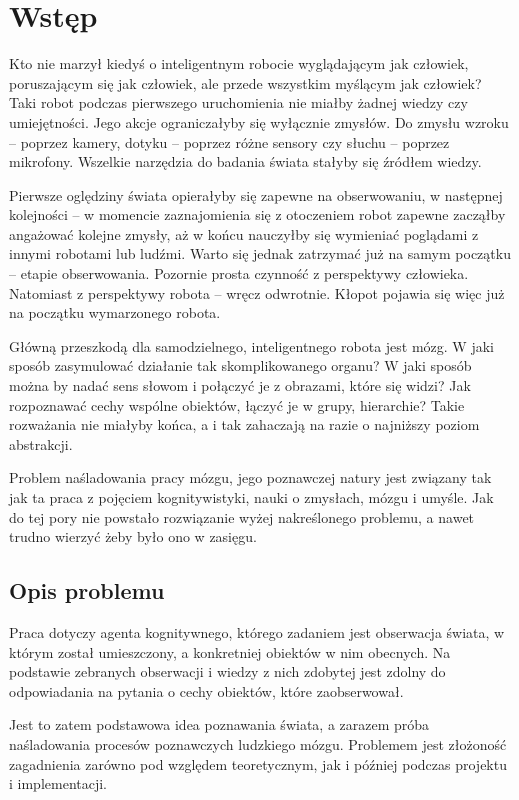 \chapter*{Wstęp}

Kto nie marzył kiedyś o inteligentnym robocie wyglądającym jak człowiek, poruszającym się jak człowiek, ale przede wszystkim myślącym jak człowiek? Taki robot podczas pierwszego uruchomienia nie miałby żadnej wiedzy czy umiejętności. Jego akcje ograniczałyby się wyłącznie zmysłów. Do zmysłu wzroku -- poprzez kamery, dotyku -- poprzez różne sensory czy słuchu -- poprzez mikrofony. Wszelkie narzędzia do badania świata stałyby się źródłem wiedzy.

Pierwsze oględziny świata opierałyby się zapewne na obserwowaniu, w następnej kolejności -- w momencie zaznajomienia się z otoczeniem robot zapewne zacząłby angażować kolejne zmysły, aż w końcu nauczyłby się wymieniać poglądami z innymi robotami lub ludźmi. Warto się jednak zatrzymać już na samym początku -- etapie obserwowania. Pozornie prosta czynność z perspektywy człowieka. Natomiast z perspektywy robota -- wręcz odwrotnie. Kłopot pojawia się więc już na początku wymarzonego robota.

Główną przeszkodą dla samodzielnego, inteligentnego robota jest mózg. W jaki sposób zasymulować działanie tak skomplikowanego organu? W jaki sposób można by nadać sens słowom i połączyć je z obrazami, które się widzi? Jak rozpoznawać cechy wspólne obiektów, łączyć je w grupy, hierarchie? Takie rozważania nie miałyby końca, a i tak zahaczają na razie o najniższy poziom abstrakcji.

Problem naśladowania pracy mózgu, jego poznawczej natury jest związany tak jak ta praca z pojęciem kognitywistyki, nauki o zmysłach, mózgu i umyśle. Jak do tej pory nie powstało rozwiązanie wyżej nakreślonego problemu, a nawet trudno wierzyć żeby było ono w zasięgu.


\section*{Opis problemu}

Praca dotyczy agenta kognitywnego, którego zadaniem jest obserwacja świata, w którym został umieszczony, a konkretniej obiektów w nim obecnych. Na podstawie zebranych obserwacji i wiedzy z nich zdobytej jest zdolny do odpowiadania na pytania o cechy obiektów, które zaobserwował. 

Jest to zatem podstawowa idea poznawania świata, a zarazem próba naśladowania procesów poznawczych ludzkiego mózgu. Problemem jest złożoność zagadnienia zarówno pod względem teoretycznym, jak i później podczas projektu i implementacji.


